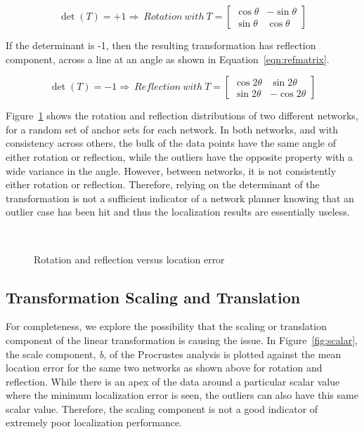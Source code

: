 \begin{equation}
	\det{(T)}=+1 \Rightarrow ~Rotation ~with ~T=
	\begin{bmatrix}
	\cos{\theta} & -\sin{\theta} \\ 
	\sin{\theta} & \cos{\theta}\end{bmatrix}
	\label{eqn:rotmatrix} 
\end{equation}

If the determinant is -1, then the resulting transformation has reflection component, across a line at an angle as shown in Equation~\ref{eqn:refmatrix}. 

\begin{equation}
	\det{(T)}=-1 \Rightarrow ~Reflection ~with ~T=
	\begin{bmatrix}
	\cos{2{\theta}} & \sin{2{\theta}} \\ 
	\sin{2{\theta}} & -\cos{2{\theta}}\end{bmatrix}
	\label{eqn:refmatrix} 
\end{equation}

Figure~\ref{fig:rotref} shows the rotation and reflection distributions of two different networks, for a random set of anchor sets for each network.  In both networks, and with consistency across others, the bulk of the data points have the same angle of either rotation or reflection, while the outliers have the opposite property with a wide variance in the angle.  However, between networks, it is not consistently either rotation or reflection.  Therefore, relying on the determinant of the transformation is not a sufficient indicator of a network planner knowing that an outlier case has been hit and thus the localization results are essentially useless.

\begin{figure}
  \centering
\\
	\caption{Rotation and reflection versus location error}	
	\label{fig:rotref}
\end{figure}

\subsection{Transformation Scaling and Translation}

For completeness, we explore the possibility that the scaling or translation component of the linear transformation is causing the issue.  In Figure~\ref{fig:scalar}, the scale component, \emph{b}, of the Procrustes analysis is plotted against the mean location error for the same two networks as shown above for rotation and reflection.  While there is an apex of the data around a particular scalar value where the minimum localization error is seen, the outliers can also have this same scalar value.  Therefore, the scaling component is not a good indicator of  extremely poor localization performance.

